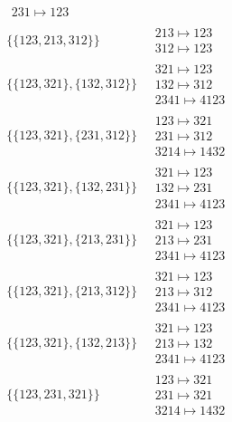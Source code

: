 \begin{scriptsize}
\begin{align}
\begin{matrix}
231 \mapsto 123
\end{matrix}
\\
\{\{123, 213, 312\}\}
\ 
&
\begin{matrix}
213 \mapsto 123
\\
312 \mapsto 123
\end{matrix}
\\
\{\{123, 321\}, \{132, 312\}\}
\ 
&
\begin{matrix}
321 \mapsto 123
\\
132 \mapsto 312
\\
2341 \mapsto 4123
\end{matrix}
\\
\{\{123, 321\}, \{231, 312\}\}
\ 
&
\begin{matrix}
123 \mapsto 321
\\
231 \mapsto 312
\\
3214 \mapsto 1432
\end{matrix}
\\
\{\{123, 321\}, \{132, 231\}\}
\ 
&
\begin{matrix}
321 \mapsto 123
\\
132 \mapsto 231
\\
2341 \mapsto 4123
\end{matrix}
\\
\{\{123, 321\}, \{213, 231\}\}
\ 
&
\begin{matrix}
321 \mapsto 123
\\
213 \mapsto 231
\\
2341 \mapsto 4123
\end{matrix}
\\
\{\{123, 321\}, \{213, 312\}\}
\ 
&
\begin{matrix}
321 \mapsto 123
\\
213 \mapsto 312
\\
2341 \mapsto 4123
\end{matrix}
\\
\{\{123, 321\}, \{132, 213\}\}
\ 
&
\begin{matrix}
321 \mapsto 123
\\
213 \mapsto 132
\\
2341 \mapsto 4123
\end{matrix}
\\
\{\{123, 231, 321\}\}
\ 
&
\begin{matrix}
123 \mapsto 321
\\
231 \mapsto 321
\\
3214 \mapsto 1432
\end{matrix}
\\

\end{align}
\end{scriptsize}
